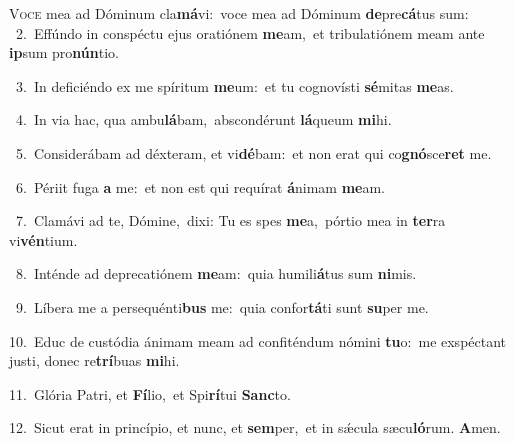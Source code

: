\lettrine{\initial\textcolor{\initialcolor}{V}}{oce} mea ad Dóminum cla\-\textbf{má}\-vi:~\star voce mea ad Dóminum \textbf{de}\-pre\-\textbf{cá}\-tus sum:\\
{\numbfont\textcolor{\numbcolor}{~2.}}~Effúndo in conspéctu ejus oratiónem \textbf{me}\-am,~\star et tribulatiónem meam ante \textbf{ip}\-sum pro\-\textbf{nún}\-tio.\par
{\numbfont\textcolor{\numbcolor}{~3.}}~In deficiéndo ex me spíritum \textbf{me}\-um:~\star et tu cognovísti \textbf{sé}\-mitas \textbf{me}\-as.\par
{\numbfont\textcolor{\numbcolor}{~4.}}~In via hac, qua ambu\-\textbf{lá}\-bam,~\star abscondérunt \textbf{lá}\-queum \textbf{mi}\-hi.\par
{\numbfont\textcolor{\numbcolor}{~5.}}~Considerábam ad déxteram, et vi\-\textbf{dé}\-bam:~\star et non erat qui co\-\textbf{gnó}\-sce\textbf{ret} me.\par
{\numbfont\textcolor{\numbcolor}{~6.}}~Périit fuga \textbf{a} me:~\star et non est qui requírat \textbf{á}\-nimam \textbf{me}\-am.\par
{\numbfont\textcolor{\numbcolor}{~7.}}~Clamávi ad te, Dómine,~\dagger dixi: Tu es spes \textbf{me}\-a,~\star pórtio mea in \textbf{ter}\-ra vi\-\textbf{vén}\-tium.\par
{\numbfont\textcolor{\numbcolor}{~8.}}~Inténde ad deprecatiónem \textbf{me}\-am:~\star quia humili\-\textbf{á}\-tus sum \textbf{ni}\-mis.\par
{\numbfont\textcolor{\numbcolor}{~9.}}~Líbera me a persequénti\textbf{bus} me:~\star quia confor\-\textbf{tá}\-ti sunt \textbf{su}\-per me.\par
{\numbfont\textcolor{\numbcolor}{10.}}~Educ de custódia ánimam meam ad confiténdum nómini \textbf{tu}\-o:~\star me exspéctant justi, donec re\-\textbf{trí}\-buas \textbf{mi}\-hi.\par
{\numbfont\textcolor{\numbcolor}{11.}}~Glória Patri, et \textbf{Fí}\-lio,~\star et Spi\-\textbf{rí}\-tui \textbf{Sanc}\-to.\par
{\numbfont\textcolor{\numbcolor}{12.}}~Sicut erat in princípio, et nunc, et \textbf{sem}\-per,~\star et in sǽcula sæcu\-\textbf{ló}\-rum. \textbf{A}\-men.\par
